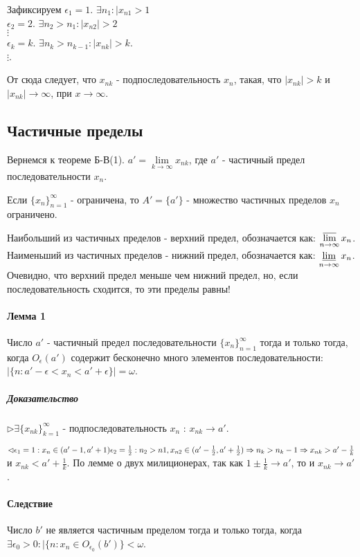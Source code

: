 \documentclass[10pt]{article}
\newcommand{\seq}[2]{ \{#1_{#2}\}_{#2=1}^\infty}
\newcommand{\seqn}[1]{\seq{#1}{n}}
\begin{document}
			Зафиксируем $\epsilon_1 = 1$. $\exists n_1 : |x_{n1} > 1$\\
			$\epsilon_2 = 2$. $\exists n_2 > n_1 : |x_{n2}| > 2$\\
			$\vdots$\\
			$\epsilon_k = k$. $\exists n_k > n_{k-1} : |x_{nk}| > k$.\\
			$\vdots$.
			
			От сюда следует, что $x_{nk}$ - подпоследовательность $x_n$, такая, что $|x_{nk}| > k$ и $|x_{nk}| \to \infty$,
			при $x \to \infty$.
			
		\subsection{Частичные пределы}
			Вернемся к теореме Б-В(1). $a' = \lim\limits_{k \to \infty} x_{nk}$, где $a'$ - частичный предел последовательности $x_n$.
			
			Если $\seqn{x}$ - ограничена, то $A' = \{a'\}$ - множество частичных пределов $x_n$ ограничено.
			
			Наибольший из частичных пределов - верхний предел, обозначается как: $\varlimsup\limits_{n \to \infty} x_n$. Наименьший из частичных пределов - нижний предел, обозначается как: $\varliminf\limits_{n \to \infty} x_n$. Очевидно, что верхний предел меньше чем нижний предел, но, если последовательность сходится, то эти пределы равны!
			
			\paragraph{Лемма 1}
			Число $a'$ - частичный предел последовательности $\seqn{x}$ тогда и только тогда, когда $O_\epsilon(a')$ содержит бесконечно много элементов последовательности: $|\{n : a' - \epsilon < x_n < a' + \epsilon\}| = \omega$.
			
			\subparagraph{Доказательство}
			$\rhd \exists \{x_{nk}\}_{k=1}^\infty$ - подпоследовательность $x_n$ : $x_{nk} \to a'$.
			
			$\lhd \epsilon_1 = 1 : x_n \in (a' - 1, a' + 1)\\
			\epsilon_2 = \frac{1}{2} : n_2 > n1, x_{n2} \in (a' - \frac{1}{2}, a' + \frac{1}{2}) \Rightarrow n_k > n_{k} - 1 \Rightarrow x_{nk} > a' - \frac{1}{k}$ и $x_{nk} < a' + \frac{1}{k}$. По лемме о двух милиционерах, так как $1 \pm \frac{1}{k} \to a'$, то и $x_{nk} \to a'$.
			
			\paragraph{Следствие}
			Число $b'$ не является частичным пределом тогда и только тогда, когда $\exists \epsilon_0 > 0 : |\{n : x_n \in O_{\epsilon_0}(b')\} < \omega$.
\end{document}
